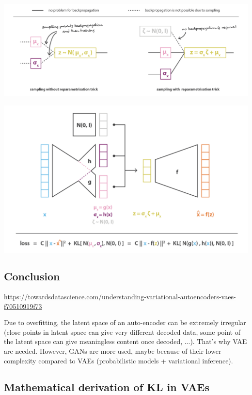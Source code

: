 \begin{itemize}
    \includegraphics[scale=0.2]{content/reparametrisation_trick.png}
    
    \includegraphics[scale=0.2]{content/final_vae_architecture.png}

\end{itemize}
\subsection{Conclusion}
\href{https://towardsdatascience.com/understanding-variational-autoencoders-vaes-f70510919f73}{https://towardsdatascience.com/understanding-variational-autoencoders-vaes-f70510919f73}

Due to overfitting, the latent space of an auto-encoder can be extremely irregular (close points in latent space can give very different decoded data, some point of the latent space can give meaningless content once decoded, ...). That's why VAE are needed.
However, GANs are more used, maybe because of their lower complexity compared to VAEs (probabilistic models + variational inference).


\subsection{Mathematical derivation of KL in VAEs}

